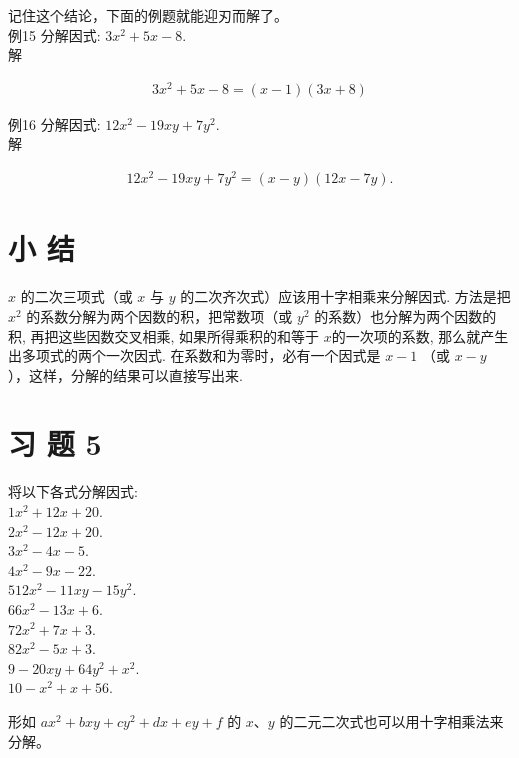 \documentclass[10pt]{article}
\begin{document}
记住这个结论，下面的例题就能迎刃而解了。\\
例15 分解因式: $3 x^{2}+5 x-8$.\\
解

\begin{align*}
3 x^{2}+5 x-8=(x-1)(3 x+8)
\end{align*}

例16 分解因式: $12 x^{2}-19 x y+7 y^{2}$.\\
解

\begin{align*}
12 x^{2}-19 x y+7 y^{2}=(x-y)(12 x-7 y) .
\end{align*}

\section*{小 结}
$x$ 的二次三项式（或 $x$ 与 $y$ 的二次齐次式）应该用十字相乘来分解因式. 方法是把 $x^{2}$ 的系数分解为两个因数的积，把常数项（或 $y^{2}$ 的系数）也分解为两个因数的积, 再把这些因数交叉相乘, 如果所得乘积的和等于 $x$的一次项的系数, 那么就产生出多项式的两个一次因式. 在系数和为零时，必有一个因式是 $x-1$ （或 $x-y$ ），这样，分解的结果可以直接写出来.

\section*{习 题 5}
将以下各式分解因式:\\
$1 x^{2}+12 x+20$.\\
$2 x^{2}-12 x+20$.\\
$3 x^{2}-4 x-5$.\\
$4 x^{2}-9 x-22$.\\
$512 x^{2}-11 x y-15 y^{2}$.\\
$66 x^{2}-13 x+6$.\\
$72 x^{2}+7 x+3$.\\
$82 x^{2}-5 x+3$.\\
$9-20 x y+64 y^{2}+x^{2}$.\\
$10-x^{2}+x+56$.

形如 $a x^{2}+b x y+c y^{2}+d x+e y+f$ 的 $x 、 y$ 的二元二次式也可以用十字相乘法来分解。
\end{document}
